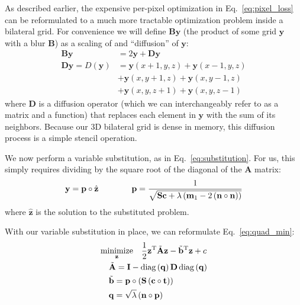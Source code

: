 As described earlier, the expensive per-pixel optimization in Eq.~\ref{eq:pixel_loss} can be reformulated to a much more tractable optimization problem inside a bilateral grid. For convenience we will define $\mathbf{B} \mathbf{y}$ (the product of some grid $\mathbf{y}$ with a blur $\mathbf{B}$) as a scaling of and ``diffusion'' of $\mathbf{y}$:
\begin{align}
\label{eq:diffuse} \mathbf{B} \mathbf{y} &= 2 \mathbf{y} + \mathbf{D} \mathbf{y} \nonumber\\
 \mathbf{D}\mathbf{y} = D(\mathbf{y}) &= \mathbf{y}(x + 1, y, z) + \mathbf{y}(x - 1, y, z) \nonumber \\
& + \mathbf{y}(x, y+1, z) + \mathbf{y}(x, y-1, z) \nonumber \\
& + \mathbf{y}(x, y, z+1) + \mathbf{y}(x, y, z-1) \nonumber
\end{align}
where $\mathbf{D}$ is a diffusion operator (which we can interchangeably refer to as a matrix and  a function) that replaces each element in $\mathbf{y}$ with the sum of its neighbors. Because our 3D bilateral grid is dense in memory, this diffusion process is a simple stencil operation.

We now perform a variable substitution, as in Eq.~\ref{eq:substitution}. For us, this simply requires dividing by the square root of the diagonal of the $\mathbf{A}$ matrix:
\begin{equation*}
  \mathbf{y} = \mathbf{p} \circ \hat{\mathbf{z}} \quad \quad  \quad \quad  \mathbf{p} = {1 \over \sqrt{ \mathbf{S} \mathbf{c} + \lambda \left( \mathbf{m}_1 - 2 \left( \mathbf{n} \circ \mathbf{n} \right) \right)}}
\end{equation*}
where $\hat{\mathbf{z}}$ is the solution to the substituted problem.

With our variable substitution in place, we can reformulate Eq.~\ref{eq:quad_min}:
\begin{align}
& \underset{\mathbf{z}}{\mathrm{minimize}} \quad {1 \over 2} \mathbf{z}^\mathrm{T} \tilde{\mathbf{A}} \mathbf{z} - \tilde{\mathbf{b}}^\mathrm{T} \mathbf{z} + c  \nonumber \\
& \quad \tilde{\mathbf{A}} = \mathbf{I} -  \operatorname{diag}\left( \mathbf{q} \right) \mathbf{D}  \operatorname{diag}\left( \mathbf{q} \right) \nonumber \\
  & \quad \tilde{\mathbf{b}} = \mathbf{p} \circ  \left( \mathbf{S} \left( \mathbf{c} \circ \mathbf{t} \right) \right) \nonumber \\
& \quad \mathbf{q} = \sqrt{\lambda} \left( \mathbf{n} \circ \mathbf{p} \right) \nonumber
\end{align}

